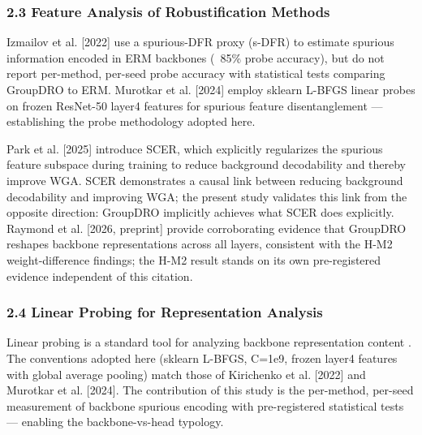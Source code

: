 \subsubsection{2.3 Feature Analysis of Robustification Methods}

Izmailov et al. [2022] use a spurious-DFR proxy (s-DFR) to estimate spurious information encoded in ERM backbones (~85\% probe accuracy), but do not report per-method, per-seed probe accuracy with statistical tests comparing GroupDRO to ERM. Murotkar et al. [2024] employ sklearn L-BFGS linear probes on frozen ResNet-50 layer4 features for spurious feature disentanglement --- establishing the probe methodology adopted here.

Park et al. [2025] introduce SCER, which explicitly regularizes the spurious feature subspace during training to reduce background decodability and thereby improve WGA. SCER demonstrates a causal link between reducing background decodability and improving WGA; the present study validates this link from the opposite direction: GroupDRO implicitly achieves what SCER does explicitly. Raymond et al. [2026, preprint] provide corroborating evidence that GroupDRO reshapes backbone representations across all layers, consistent with the H-M2 weight-difference findings; the H-M2 result stands on its own pre-registered evidence independent of this citation.

\subsubsection{2.4 Linear Probing for Representation Analysis}

Linear probing is a standard tool for analyzing backbone representation content \citep{alain2016understanding}. The conventions adopted here (sklearn L-BFGS, C=1e9, frozen layer4 features with global average pooling) match those of Kirichenko et al. [2022] and Murotkar et al. [2024]. The contribution of this study is the per-method, per-seed measurement of backbone spurious encoding with pre-registered statistical tests --- enabling the backbone-vs-head typology.

